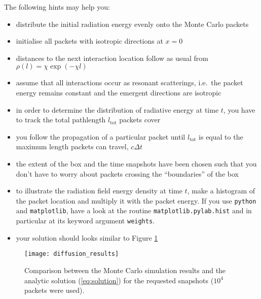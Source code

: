 \documentclass[12pt,a4paper,twoside]{article}
\begin{document}
  The following hints may help you:
  \begin{itemize}
    \item distribute the initial radiation energy evenly onto the Monte
      Carlo packets
    \item initialise all packets with isotropic directions at $x = 0$
    \item distances to the next interaction location follow as usual from
      $\rho(l) = \chi \exp(-\chi l)$
    \item assume that all interactions occur as resonant scatterings, i.e.\ the
      packet energy remains constant and the emergent directions are isotropic
    \item in order to determine the distribution of radiative energy at time
      $t$, you have to track the total pathlength $l_{\mathrm{tot}}$ packets cover
    \item you follow the propagation of a particular packet until
      $l_{\mathrm{tot}}$ is equal to the maximum length packets can travel, $c
      \Delta t$
    \item the extent of the box and the time snapshots have been chosen such
      that you don't have to worry about packets crossing the ``boundaries'' of
      the box
    \item to illustrate the radiation field energy density at time $t$, make a
      histogram of the packet location and multiply it with the packet energy.
      If you use \texttt{python} and \texttt{matplotlib}, have a look at the
      routine \texttt{matplotlib.pylab.hist} and in particular at its keyword
      argument \texttt{weights}.
    \item your solution should looks similar to Figure \ref{fig:sol}
  \end{itemize}

  \begin{figure}[h]
    \centering
    \texttt{[image: diffusion\_results]}
    \caption{Comparison between the Monte Carlo simulation results and the
      analytic solution (\ref{eq:solution}) for the requested snapshots ($10^4$
    packets were used).}
    \label{fig:sol}
  \end{figure}





  
\end{document}
